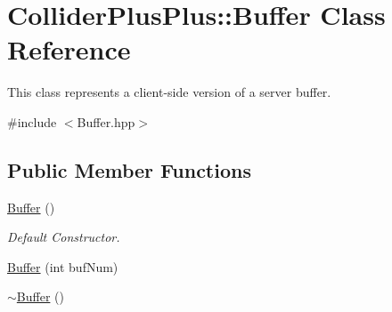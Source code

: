 \hypertarget{classColliderPlusPlus_1_1Buffer}{\section{Collider\-Plus\-Plus\-:\-:Buffer Class Reference}
\label{classColliderPlusPlus_1_1Buffer}
}


This class represents a client-\/side version of a server buffer.  




{\ttfamily \#include $<$Buffer.\-hpp$>$}

\subsection*{Public Member Functions}
\begin{DoxyCompactItemize}
\item 
\hypertarget{classColliderPlusPlus_1_1Buffer_aac5d271b57c8b6410b790794cfb790e1}{\hyperlink{classColliderPlusPlus_1_1Buffer_aac5d271b57c8b6410b790794cfb790e1}{Buffer} ()}\label{classColliderPlusPlus_1_1Buffer_aac5d271b57c8b6410b790794cfb790e1}

\begin{DoxyCompactList}\small\item\em Default Constructor. \end{DoxyCompactList}\item 
\hyperlink{classColliderPlusPlus_1_1Buffer_a85de27433fc01a2d524e9ef5d3bc2e45}{Buffer} (int buf\-Num)
\item 
\hypertarget{classColliderPlusPlus_1_1Buffer_a62178f1cb35c5654c0b16d78526de7e8}{\hyperlink{classColliderPlusPlus_1_1Buffer_a62178f1cb35c5654c0b16d78526de7e8}{$\sim$\-Buffer} ()}\label{classColliderPlusPlus_1_1Buffer_a62178f1cb35c5654c0b16d78526de7e8}


\end{DoxyCompactItemize}
